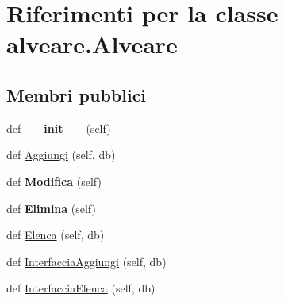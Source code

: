 \hypertarget{classalveare_1_1Alveare}{}\section{Riferimenti per la classe alveare.\+Alveare}
\label{classalveare_1_1Alveare}
\subsection*{Membri pubblici}
\begin{DoxyCompactItemize}
\item 
def {\bfseries \+\_\+\+\_\+init\+\_\+\+\_\+} (self)\hypertarget{classalveare_1_1Alveare_a0e989be377f682b42c586be0b4b7d3dc}{}\label{classalveare_1_1Alveare_a0e989be377f682b42c586be0b4b7d3dc}

\item 
def \hyperlink{classalveare_1_1Alveare_ab96add517787f0990d1a31229b84023e}{Aggiungi} (self, db)
\item 
def {\bfseries Modifica} (self)\hypertarget{classalveare_1_1Alveare_a7ea9f3467476139259dc47d40018c9e2}{}\label{classalveare_1_1Alveare_a7ea9f3467476139259dc47d40018c9e2}

\item 
def {\bfseries Elimina} (self)\hypertarget{classalveare_1_1Alveare_a8ed154d75e12163c8ba2ad6432f3813c}{}\label{classalveare_1_1Alveare_a8ed154d75e12163c8ba2ad6432f3813c}

\item 
def \hyperlink{classalveare_1_1Alveare_ae7441be09d9bf0d8c2248a24534b1285}{Elenca} (self, db)
\item 
def \hyperlink{classalveare_1_1Alveare_abf2c97ac838ed0af2326ee4cd4742820}{Interfaccia\+Aggiungi} (self, db)
\item 
def \hyperlink{classalveare_1_1Alveare_aabdd9656e20b585b82c7228ac2333abf}{Interfaccia\+Elenca} (self, db)
\end{DoxyCompactItemize}
